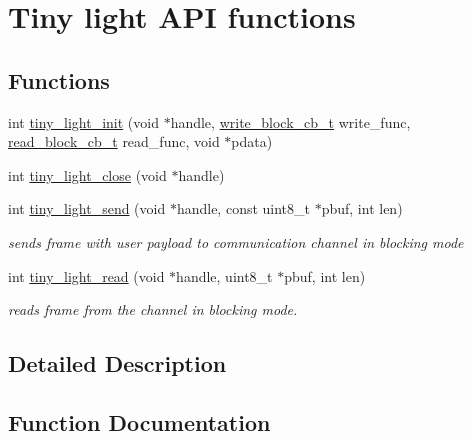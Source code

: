 \hypertarget{group__LIGHT__API}{}\section{Tiny light A\+PI functions}
\label{group__LIGHT__API}
\subsection*{Functions}
\begin{DoxyCompactItemize}
\item 
int \hyperlink{group__LIGHT__API_ga221cf790724163d1aee89ad6a6c9a14d}{tiny\+\_\+light\+\_\+init} (void $\ast$handle, \hyperlink{tiny__proto__types_8h_a7f69e669de5baa69a43ee5cb439a7496}{write\+\_\+block\+\_\+cb\+\_\+t} write\+\_\+func, \hyperlink{tiny__proto__types_8h_ae3d867e030f59de94508902f2b84a7ec}{read\+\_\+block\+\_\+cb\+\_\+t} read\+\_\+func, void $\ast$pdata)
\item 
int \hyperlink{group__LIGHT__API_ga6e045b8f4ef551c274fbacaa625e2748}{tiny\+\_\+light\+\_\+close} (void $\ast$handle)
\item 
int \hyperlink{group__LIGHT__API_ga12391f0d4c06fb6296b84fd4681a87f7}{tiny\+\_\+light\+\_\+send} (void $\ast$handle, const uint8\+\_\+t $\ast$pbuf, int len)
\begin{DoxyCompactList}\small\item\em sends frame with user payload to communication channel in blocking mode \end{DoxyCompactList}\item 
int \hyperlink{group__LIGHT__API_ga0181db79922917957779e1f2d740c407}{tiny\+\_\+light\+\_\+read} (void $\ast$handle, uint8\+\_\+t $\ast$pbuf, int len)
\begin{DoxyCompactList}\small\item\em reads frame from the channel in blocking mode. \end{DoxyCompactList}\end{DoxyCompactItemize}


\subsection{Detailed Description}


\subsection{Function Documentation}
\mbox{\label{group__LIGHT__API_ga6e045b8f4ef551c274fbacaa625e2748}} 
